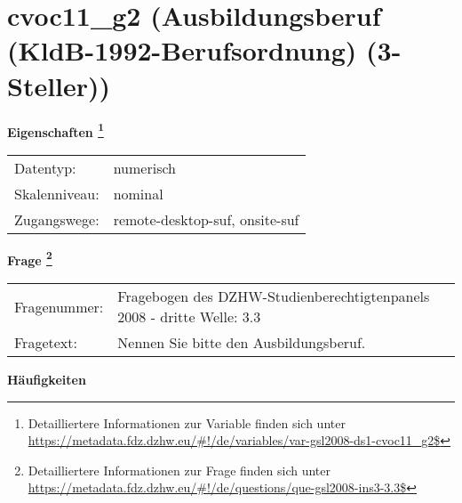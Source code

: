 
    \setcounter{footnote}{0}

    \vspace*{-1.8cm}
	\section{cvoc11\_g2 (Ausbildungsberuf (KldB-1992-Berufsordnung) (3-Steller))}
	\label{section:cvoc11_g2}



    \vspace*{0.5cm}
    \noindent\textbf{Eigenschaften
	\footnote{Detailliertere Informationen zur Variable finden sich unter
		\url{https://metadata.fdz.dzhw.eu/\#!/de/variables/var-gsl2008-ds1-cvoc11_g2$}}}\\
	\begin{tabularx}{\hsize}{@{}lX}
	Datentyp: & numerisch \\
	Skalenniveau: & nominal \\
	Zugangswege: &
	  remote-desktop-suf, 
	  onsite-suf
 \\
    \end{tabularx}



				\vspace*{0.5cm}
                \noindent\textbf{Frage
	                \footnote{Detailliertere Informationen zur Frage finden sich unter
		              \url{https://metadata.fdz.dzhw.eu/\#!/de/questions/que-gsl2008-ins3-3.3$}}}\\
				\begin{tabularx}{\hsize}{@{}lX}
					Fragenummer: &
					  Fragebogen des DZHW-Studienberechtigtenpanels 2008 - dritte Welle:
					  3.3
 \\
					Fragetext: & Nennen Sie bitte den Ausbildungsberuf. \\
				\end{tabularx}





        		\vspace*{0.5cm}
                \noindent\textbf{Häufigkeiten}

